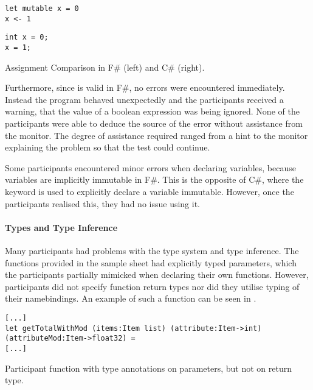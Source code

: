 \begin{listing}[H]
\begin{minipage}{.45\textwidth}
\begin{verbatim}
let mutable x = 0
x <- 1
\end{verbatim}
\end{minipage}
\hfill
\begin{minipage}{.45\textwidth}
\begin{verbatim}
int x = 0;
x = 1;
\end{verbatim}
\end{minipage}
\caption{Assignment Comparison in F\# (left) and C\# (right).}
\label{lst:ass-comp}
\end{listing}

Furthermore, since  is valid in F\#, no errors were encountered immediately. Instead the program behaved unexpectedly and the participants received a warning, that the value of a boolean expression was being ignored. None of the participants were able to deduce the source of the error without assistance from the monitor. The degree of assistance required ranged from a hint to the monitor explaining the problem so that the test could continue.

Some participants encountered minor errors when declaring variables, because variables are implicitly immutable in F\#. This is the opposite of C\#, where the  keyword is used to explicitly declare a variable immutable. However, once the participants realised this, they had no issue using it.

\paragraph{Types and Type Inference}
Many participants had problems with the type system and type inference. The functions provided in the sample sheet had explicitly typed parameters, which the participants partially mimicked when declaring their own functions. However, participants did not specify function return types nor did they utilise typing of their namebindings. An example of such a function can be seen in .

\begin{listing}[H]
\begin{verbatim}
[...]
let getTotalWithMod (items:Item list) (attribute:Item->int) (attributeMod:Item->float32) =
[...]
\end{verbatim}
\caption{Participant function with type annotations on parameters, but not on return type.}
\label{lst:part-func}
\end{listing}


